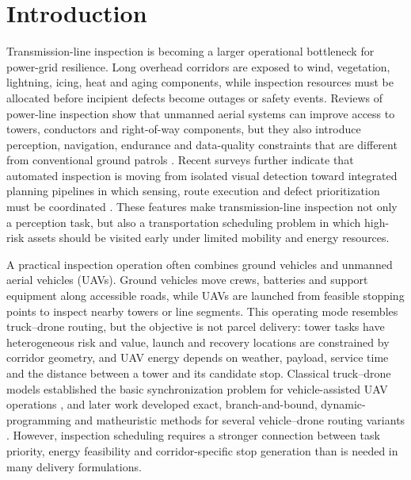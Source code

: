 ﻿\section{Introduction}

Transmission-line inspection is becoming a larger operational bottleneck for power-grid resilience. Long overhead corridors are exposed to wind, vegetation, lightning, icing, heat and aging components, while inspection resources must be allocated before incipient defects become outages or safety events. Reviews of power-line inspection show that unmanned aerial systems can improve access to towers, conductors and right-of-way components, but they also introduce perception, navigation, endurance and data-quality constraints that are different from conventional ground patrols \citep{nguyen2018visionreview,li2021uavtransmission,ahmed2024powerline}. Recent surveys further indicate that automated inspection is moving from isolated visual detection toward integrated planning pipelines in which sensing, route execution and defect prioritization must be coordinated \citep{zhang2020visualinspection,li2025deeppowerline}. These features make transmission-line inspection not only a perception task, but also a transportation scheduling problem in which high-risk assets should be visited early under limited mobility and energy resources.

A practical inspection operation often combines ground vehicles and unmanned aerial vehicles (UAVs). Ground vehicles move crews, batteries and support equipment along accessible roads, while UAVs are launched from feasible stopping points to inspect nearby towers or line segments. This operating mode resembles truck--drone routing, but the objective is not parcel delivery: tower tasks have heterogeneous risk and value, launch and recovery locations are constrained by corridor geometry, and UAV energy depends on weather, payload, service time and the distance between a tower and its candidate stop. Classical truck--drone models established the basic synchronization problem for vehicle-assisted UAV operations \citep{murray2015flying,agatz2018tspdrone,wang2019vrpd,murray2020multiple}, and later work developed exact, branch-and-bound, dynamic-programming and matheuristic methods for several vehicle--drone routing variants \citep{poikonen2019branch,roberti2021exact,bouman2018dynamic,ha2018mincost,schermer2019matheuristic}. However, inspection scheduling requires a stronger connection between task priority, energy feasibility and corridor-specific stop generation than is needed in many delivery formulations.

